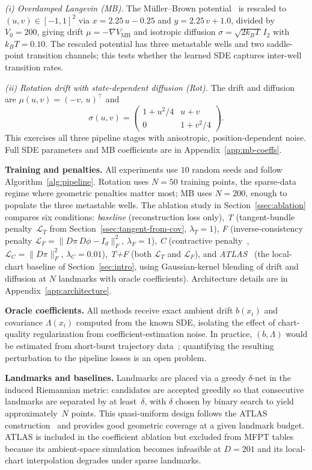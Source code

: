\documentclass[11pt]{article}
\newcommand{\cL}{\mathcal{L}}
\begin{document}
\emph{(i) Overdamped Langevin (MB).}
The M\"uller--Brown potential~\cite{MullerBrown1979}
is rescaled to $(u,v)\in[-1,1]^2$ via
$x=2.25\,u-0.25$ and $y=2.25\,v+1.0$, divided by
$V_0{=}200$, giving drift
$\mu=-\nabla V_{\mathrm{MB}}$ and isotropic diffusion
$\sigma=\sqrt{2k_BT}\,I_2$ with $k_BT{=}0.10$.
The rescaled potential has three metastable wells and
two saddle-point transition channels; this tests
whether the learned SDE captures inter-well
transition rates.

\emph{(ii) Rotation drift with state-dependent
diffusion (Rot).}
The drift and diffusion are
$\mu(u,v)=(-v,\,u)^\top$ and
\[
  \sigma(u,v) =
  \begin{pmatrix}
    1+u^2/4 & u+v \\
    0 & 1+v^2/4
  \end{pmatrix}.
\]
This exercises all three pipeline stages with
anisotropic, position-dependent noise.
Full SDE parameters and MB coefficients are in
Appendix~\ref{app:mb-coeffs}.

\noindent \textbf{Training and penalties.}
All experiments use $10$ random seeds and follow
Algorithm~\ref{alg:pipeline}.
Rotation uses $N{=}50$ training points, the sparse-data
regime where geometric penalties matter most; MB uses
$N{=}200$, enough to populate the three metastable wells.
The ablation study in Section~\ref{ssec:ablation} compares
six conditions:
\emph{baseline} (reconstruction loss only),
\emph{T} (tangent-bundle penalty~$\cL_T$ from
Section~\ref{ssec:tangent-from-cov}, $\lambda_T{=}1$),
\emph{F} (inverse-consistency penalty
$\cL_F{=}\|D\pi\,D\phi{-}I_d\|_F^2$, $\lambda_F{=}1$),
\emph{C} (contractive penalty~\cite{contractiveAutoEncoders},
$\cL_C{=}\|D\pi\|_F^2$, $\lambda_C{=}0.01$),
\emph{T+F} (both $\cL_T$ and $\cL_F$), and
\emph{ATLAS}~\cite{yym} (the local-chart baseline of
Section~\ref{sec:intro}, using Gaussian-kernel blending
of drift and diffusion at $N$ landmarks with oracle
coefficients).
Architecture details are in Appendix~\ref{app:architecture}.

\noindent \textbf{Oracle coefficients.}
All methods receive exact ambient drift $b(x_i)$ and
covariance $\Lambda(x_i)$ computed from the known SDE,
isolating the effect of chart-quality regularization
from coefficient-estimation noise.
In practice, $(b,\Lambda)$ would be estimated from
short-burst trajectory data~\cite{Miles17,yym};
quantifying the resulting perturbation to the
pipeline losses is an open problem.

\noindent \textbf{Landmarks and baselines.}
Landmarks are placed via a greedy $\delta$-net in
the induced Riemannian metric: candidates are accepted
greedily so that consecutive landmarks are separated
by at least~$\delta$, with $\delta$ chosen by binary
search to yield approximately~$N$ points.
This quasi-uniform design follows the ATLAS
construction~\cite{Miles17} and provides good
geometric coverage at a given landmark budget.
ATLAS is included in the coefficient ablation but
excluded from MFPT tables because its ambient-space
simulation becomes infeasible at $D{=}201$ and its
local-chart interpolation degrades under sparse
landmarks.
\end{document}
